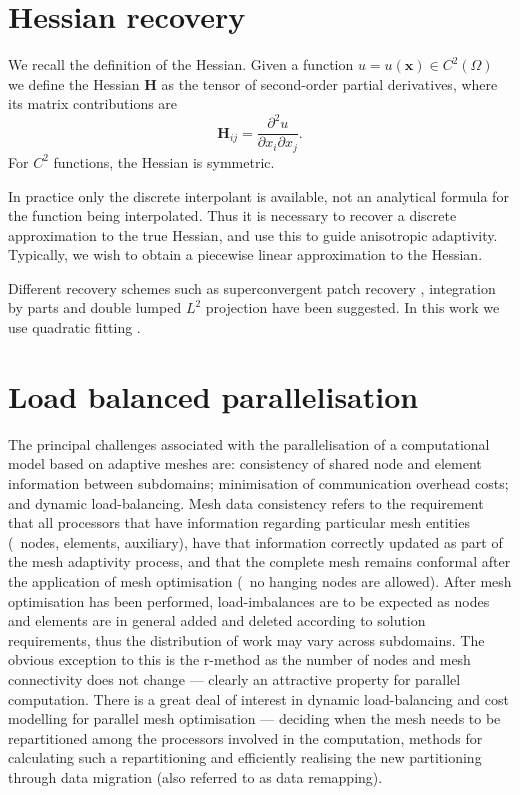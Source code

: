 \section{Hessian recovery}
We recall the definition of the Hessian.  Given a function
$u=u(\pmb{x}) \in C^2(\Omega)$ we define the Hessian $\pmb{H}$ as the
tensor of second-order partial derivatives, where its matrix
contributions are
\begin{equation} \label{eqn:hessian}
  \pmb{H}_{ij} = \frac{\partial^2u}{\partial x_i \partial x_j}.
\end{equation}
For $C^2$ functions, the Hessian is symmetric.

In practice only the discrete interpolant is available, not
an analytical formula for the function being interpolated. Thus it is
necessary to recover a discrete approximation to the true Hessian, and
use this to guide anisotropic adaptivity. Typically, we wish to obtain
a piecewise linear approximation to the Hessian.

Different recovery schemes such as superconvergent patch recovery
\citep{zienkiewicz1992}, integration by parts \citep{buscaglia1997}
and double lumped $L^2$ projection \citep{pain2001} have been
suggested. In this work we use quadratic fitting \citep{vallet2007}.

\section{Load balanced parallelisation}
The principal challenges associated with the parallelisation of a
computational model based on adaptive meshes are: consistency of
shared node and element information between subdomains; minimisation
of communication overhead costs; and dynamic load-balancing. Mesh data
consistency refers to the requirement that all processors that have
information regarding particular mesh entities (\ie\ nodes, elements,
auxiliary), have that information correctly updated as part of the
mesh adaptivity process, and that the complete mesh remains conformal
after the application of mesh optimisation (\ie\ no hanging nodes are
allowed). After mesh optimisation has been performed, load-imbalances
are to be expected as nodes and elements are in general added and
deleted according to solution requirements, thus the distribution of
work may vary across subdomains. The obvious exception to this is the
r-method as the number of nodes and mesh connectivity does not change
--- clearly an attractive property for parallel computation.  There is
a great deal of interest in dynamic load-balancing and cost modelling
for parallel mesh optimisation --- deciding when the mesh needs to be
repartitioned among the processors involved in the computation,
methods for calculating such a repartitioning and efficiently
realising the new partitioning through data migration (also referred
to as data remapping).

